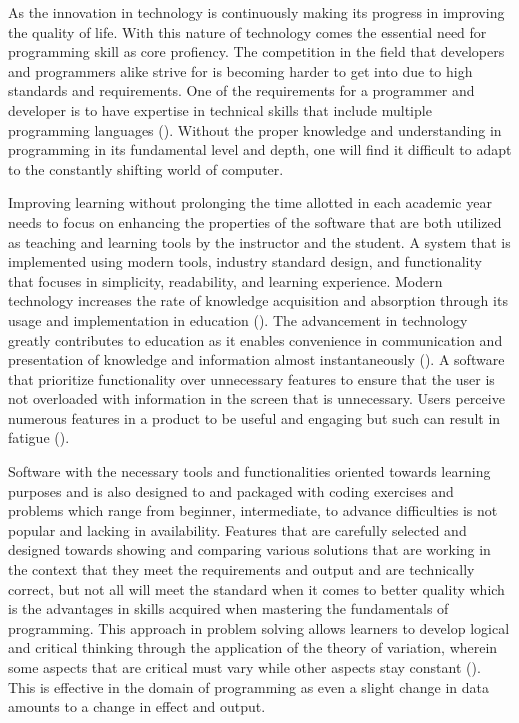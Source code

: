 \justifying
\parx
As the innovation in technology is continuously making its progress in improving
the quality of life. With this nature of technology comes the essential need for
programming skill as core profiency. The competition in the field that
developers and programmers alike strive for is becoming harder to get into due
to high standards and requirements. One of the requirements for a programmer and
developer is to have expertise in technical skills that include multiple
programming languages (\cite{tsai_yang_chang_2015}). Without the proper
knowledge and understanding in programming in its fundamental level and depth,
one will find it difficult to adapt to the constantly shifting world of
computer.

\parx
Improving learning without prolonging the time allotted in each
academic year needs to focus on enhancing the properties of the software that
are both utilized as teaching and learning tools by the instructor and the
student. A system that is implemented using modern tools, industry
standard design, and functionality that focuses in simplicity, readability, and
learning experience. Modern technology increases the rate of knowledge
acquisition and absorption through its usage and implementation in education
(\cite{raja_nagasubramani_2018}). The advancement in technology greatly
contributes to education as it enables convenience in communication and
presentation of knowledge and information almost instantaneously
(\cite{anggrawan_ibrahim_m}). A software that prioritize functionality over
unnecessary features to ensure that the user is not overloaded with information
in the screen that is unnecessary. Users perceive numerous features in a product
to be useful and engaging but such can result in fatigue
(\cite{thompson_hamilton_rust_2005}).

\parx
Software with the necessary tools and functionalities oriented towards learning
purposes and is also designed to and packaged with coding exercises and problems
which range from beginner, intermediate, to advance difficulties is not popular
and lacking in availability. Features that are carefully selected and designed
towards showing and comparing various solutions that are working in the context
that they meet the requirements and output and are technically correct, but not
all will meet the standard when it comes to better quality which is the
advantages in skills acquired when mastering the fundamentals of programming.
This approach in problem solving allows learners to develop logical and critical
thinking through the application of the theory of variation, wherein some
aspects that are critical must vary while other aspects stay constant
(\cite{cheng_2016}). This is effective in the domain of programming as even a
slight change in data amounts to a change in effect and output.

